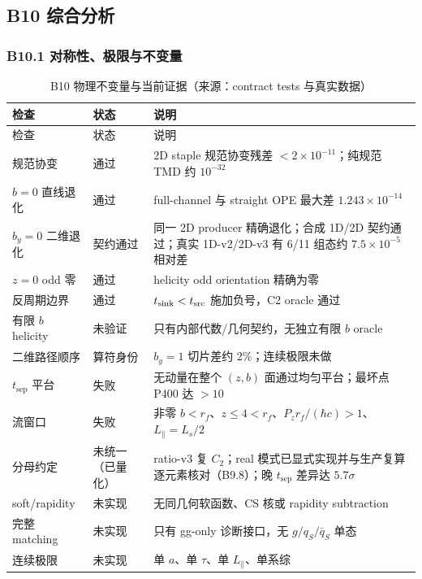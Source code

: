 \documentclass[UTF8]{ctexart}
\newcommand{\Pz}{P_z}
\newcommand{\ts}{t_{\mathrm{sep}}}
\begin{document}
\subsection{B10 综合分析}

\subsubsection{B10.1 对称性、极限与不变量}

\begin{xltabular}{\textwidth}{@{}p{0.22\textwidth}p{0.20\textwidth}X@{}}
\caption{B10 物理不变量与当前证据（来源：contract tests 与真实数据）}\\
\toprule
检查 & 状态 & 说明 \\
\midrule
\endfirsthead
\toprule
检查 & 状态 & 说明 \\
\midrule
\endhead
规范协变 & 通过 & 2D staple 规范协变残差 \(<2\times10^{-11}\)；纯规范 TMD 约 \(10^{-32}\) \\
\(b=0\) 直线退化 & 通过 & full-channel 与 straight OPE 最大差 \(1.243\times10^{-14}\) \\
\(b_y=0\) 二维退化 & 契约通过 & 同一 2D producer 精确退化；合成 1D/2D 契约通过；真实 1D-v2/2D-v3 有 6/11 组态约 \(7.5\times10^{-5}\) 相对差 \\
\(z=0\) odd 零 & 通过 & helicity odd orientation 精确为零 \\
反周期边界 & 通过 & \(t_{\rm sink}<t_{\rm src}\) 施加负号，C2 oracle 通过 \\
有限 \(b\) helicity & 未验证 & 只有内部代数/几何契约，无独立有限 \(b\) oracle \\
二维路径顺序 & 算符身份 & \(b_y=1\) 切片差约 2\%；连续极限未做 \\
\(\ts\) 平台 & 失败 & 无动量在整个 \((z,b)\) 面通过均匀平台；最坏点 P400 达 \(>10\) \\
流窗口 & 失败 & 非零 \(b<r_f\)、\(z\le4<r_f\)、\(\Pz r_f/(\hbar c)>1\)、\(L_\parallel=L_s/2\) \\
分母约定 & 未统一（已量化） & ratio-v3 复 \(C_2\)；real 模式已显式实现并与生产复算逐元素核对（B9.8）；晚 \(\ts\) 差异达 \(5.7\sigma\) \\
soft/rapidity & 未实现 & 无同几何软函数、CS 核或 rapidity subtraction \\
完整 matching & 未实现 & 只有 gg-only 诊断接口，无 \(g/q_S/\bar q_S\) 单态 \\
连续极限 & 未实现 & 单 \(a\)、单 \(\tau\)、单 \(L_\parallel\)、单系综 \\
\bottomrule
\end{xltabular}
\end{document}
